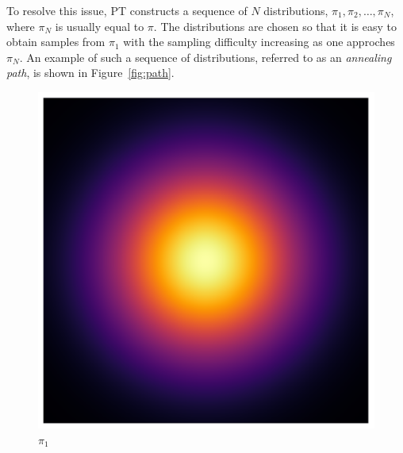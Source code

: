 To resolve this issue, PT constructs a sequence of $N$ distributions,  
$\pi_1, \pi_2, \ldots, \pi_N$, where $\pi_N$ is usually equal to $\pi$.
The distributions are chosen so that it is easy to obtain samples from $\pi_1$
with the sampling difficulty increasing as one approches $\pi_N$. An example 
of such a sequence of distributions, referred to as an \textit{annealing path},
is shown in Figure~\ref{fig:path}.

\begin{figure}[t]
    \centering
    \begin{minipage}{0.15\textwidth}
      \centering
      \includegraphics[width=\textwidth]{../img/heatmap_path_1.pdf}
      \caption*{$\pi_1$}
    \end{minipage}
    \begin{minipage}{0.15\textwidth}
      \centering

\end{minipage}
\end{figure}
